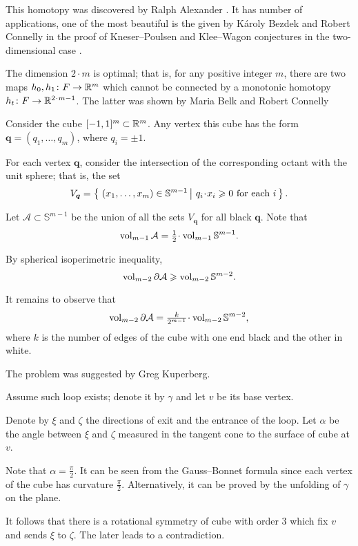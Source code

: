 This homotopy was discovered by Ralph Alexander \cite[see][]{ralexander}.
It has number of applications, 
one of the most beautiful is the given 
by K\'aroly Bezdek 
and Robert Connelly 
in the proof of 
Kneser--Poulsen  
and Klee--Wagon conjectures in the two-dimensional case \cite[see][]{bezdek-connelly}.

The dimension $2\cdot m$ is optimal;
that is, for any positive integer $m$,
there are two maps $h_0,h_1\colon F\to \mathbb{R}^m$ which cannot be connected by a monotonic homotopy $h_t\:F\to\RR^{2\cdot m-1}$.
The latter was shown by Maria Belk and Robert Connelly \cite[see][]{belk-connelly}



Consider the cube $[-1,1]^m\subset \mathbb{R}^m$.
Any vertex this cube has the form $\bm{q}=(q_1,\dots,q_m)$,
where  $q_i=\pm1$.

For each vertex $\bm{q}$,
consider the intersection of the corresponding octant with the unit sphere;
that is, the set
\[V_{\bm{q}}=\set{(x_1,\dots,x_m)\in\mathbb{S}^{m-1}}{q_i\cdot x_i\ge 0\ \text{for each}\ i}.\]

Let $\mathcal{A}\subset\mathbb{S}^{m-1}$ be the union of all the sets $V_{\bm{q}}$ for all black $\bm{q}$.
Note that 
\[\vol_{m-1}\mathcal{A}=\tfrac12\cdot\vol_{m-1}\mathbb{S}^{m-1}.\]

By spherical isoperimetric inequality,
\[\operatorname{\rm vol}\nolimits_{m-2}\partial\mathcal{A}
\geqslant \operatorname{\rm vol}\nolimits_{m-2}\mathbb{S}^{m-2}.\] 

It remains to observe that
\[\vol_{m-2}\partial\mathcal{A}
=
\tfrac k{2^{m-1}}\cdot\vol_{m-2}\mathbb{S}^{m-2},\]
where $k$ is the number of edges of the cube with one end black and the other in white.
\qeds

The problem was suggested by Greg Kuperberg.

Assume such loop exists; denote it by $\gamma$ and let $v$ be its base vertex.

Denote by $\xi$ and $\zeta$ the directions of exit and the entrance of the loop.
Let $\alpha$ be the angle between $\xi$ and $\zeta$
measured in the tangent cone to the surface of cube at $v$.

Note that $\alpha=\tfrac\pi2$.
It can be seen from the Gauss--Bonnet formula since each vertex of the cube has curvature $\tfrac\pi2$.
Alternatively, it can be proved by the unfolding of $\gamma$ on the plane.

It follows that there is a rotational symmetry of cube with order 3 which fix $v$ and sends $\xi$ to $\zeta$.
The later leads to a contradiction.
\qeds

